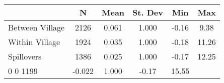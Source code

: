\begin{tabular}{l*{5}{c}}\hline&\multicolumn{1}{c}{N}&\multicolumn{1}{c}{Mean}&\multicolumn{1}{c}{St. Dev}&\multicolumn{1}{c}{Min}&\multicolumn{1}{c}{Max}\\ \hline 
Between Village & 2126 & 0.061 & 1.000 & -0.16 & 9.38 \\
Within Village & 1924 & 0.035 & 1.000 & -0.18 & 11.26 \\
Spillovers & 1386 & 0.025 & 1.000 & -0.17 & 12.25 \\
0 0 1199 & -0.022 & 1.000 & -0.17 & 15.55 \\
\hline \end{tabular}
